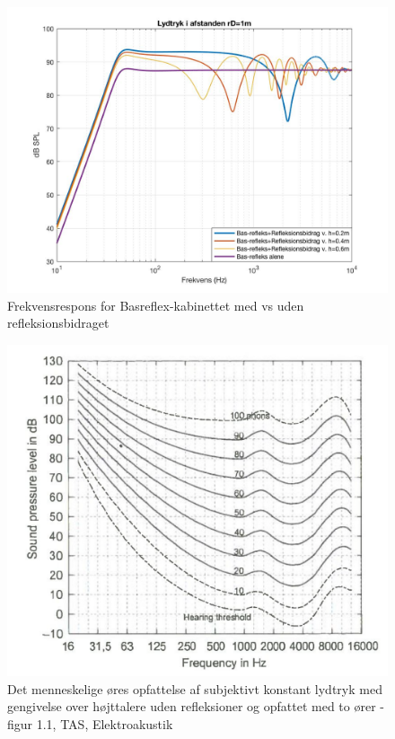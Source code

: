\begin{figure}[h!]
	\centering
	\includegraphics[width=.8\textwidth]{Pics/sim_samletrespons2}
	\caption{Frekvensrespons for Basreflex-kabinettet med vs uden refleksionsbidraget} 
	\label{fig:sim_samletrespons}
\end{figure}


\begin{figure}[h!]
	\centering
	\includegraphics[width=.5\textwidth]{Pics/pressure}
	\caption{Det menneskelige øres opfattelse af subjektivt konstant lydtryk med gengivelse over højttalere uden refleksioner og opfattet med to ører - figur 1.1, TAS, Elektroakustik \cite{Elektroakustik}} 
	\label{fig:pressure}
\end{figure}